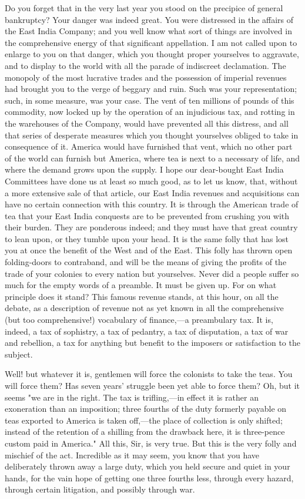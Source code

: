 Do you forget that in the very last year you stood on the precipice of general bankruptcy? Your danger was indeed great. You were distressed in the affairs of the East India Company; and you well know what sort of things are involved in the comprehensive energy of that significant appellation. I am not called upon to enlarge to you on that danger, which you thought proper yourselves to aggravate, and to display to the world with all the parade of indiscreet declamation. The monopoly of the most lucrative trades and the possession of imperial revenues had brought you to the verge of beggary and ruin. Such was your representation; such, in some measure, was your case. The vent of ten millions of pounds of this commodity, now locked up by the operation of an injudicious tax, and rotting in the warehouses of the Company, would have prevented all this distress, and all that series of desperate measures which you thought yourselves obliged to take in consequence of it. America would have furnished that vent, which no other part of the world can furnish but America, where tea is next to a necessary of life, and where the demand grows upon the supply. I hope our dear-bought East India Committees have done us at least so much good, as to let us know, that, without a more extensive sale of that article, our East India revenues and acquisitions can have no certain connection with this country. It is through the American trade of tea that your East India conquests are to be prevented from crushing you with their burden. They are ponderous indeed; and they must have that great country to lean upon, or they tumble upon your head. It is the same folly that has lost you at once the benefit of the West and of the East. This folly has thrown open folding-doors to contraband, and will be the means of giving the profits of the trade of your colonies to every nation but yourselves. Never did a people suffer so much for the empty words of a preamble. It must be given up. For on what principle does it stand? This famous revenue stands, at this hour, on all the debate, as a description of revenue not as yet known in all the comprehensive (but too comprehensive!) vocabulary of finance,—a preambulary tax. It is, indeed, a tax of sophistry, a tax of pedantry, a tax of disputation, a tax of war and rebellion, a tax for anything but benefit to the imposers or satisfaction to the subject.

Well! but whatever it is, gentlemen will force the colonists to take the teas. You will force them? Has seven years' struggle been yet able to force them? Oh, but it seems "we are in the right. The tax is trifling,—in effect it is rather an exoneration than an imposition; three fourths of the duty formerly payable on teas exported to America is taken off,—the place of collection is only shifted; instead of the retention of a shilling from the drawback here, it is three-pence custom paid in America." All this, Sir, is very true. But this is the very folly and mischief of the act. Incredible as it may seem, you know that you have deliberately thrown away a large duty, which you held secure and quiet in your hands, for the vain hope of getting one three fourths less, through every hazard, through certain litigation, and possibly through war.

